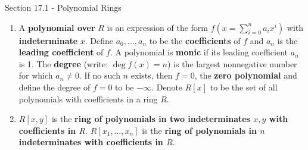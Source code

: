\documentclass[12pt]{article}
\theoremstyle{definition}
\theoremstyle{named}
\begin{document}
\begin{section}{Section 17.1 - Polynomial Rings}
    \begin{enumerate}
        \item A \textbf{polynomial over} $R$ is an expression of the form $f(x = \sum_{i=0}^{n}a_ix^i)$ with \textbf{indeterminate} $x$. Define $a_0,\dots,a_n$ to be the \textbf{coefficients} of $f$ and $a_n$ is the \textbf{leading coefficient} of $f$. A polynomial is \textbf{monic} if its leading coefficient $a_n$ is 1. The \textbf{degree} (write: $\deg f(x) = n$) is the largest nonnegative number for which $a_n \neq 0$. If no such $n$ exists, then $f=0$, the \textbf{zero polynomial} and define the degree of $f=0$ to be $-\infty$. Denote $R[x]$ to be the set of all polynomials with coefficients in a ring $R$. 
        \item $R[x,y]$ is the \textbf{ring of polynomials in two indeterminates $x,y$ with coefficients in $R$}. $R[x_1,\dots,x_n]$ is the \textbf{ring of polynomials in $n$ indeterminates with coefficients in $R$}. 
    \end{enumerate}
\end{section}
\end{document}
